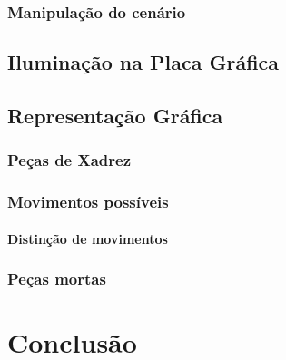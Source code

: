 \documentclass[11pt,a4paper]{report}
\begin{document}
\subsection{Manipulação do cenário}

\section{Iluminação na Placa Gráfica}

\section{Representação Gráfica}

\subsection{Peças de Xadrez}

\subsection{Movimentos possíveis}

\subsubsection{Distinção de movimentos}

\subsection{Peças mortas}



\chapter{Conclusão}
%




%
%

\listoffigures

\end{document}
